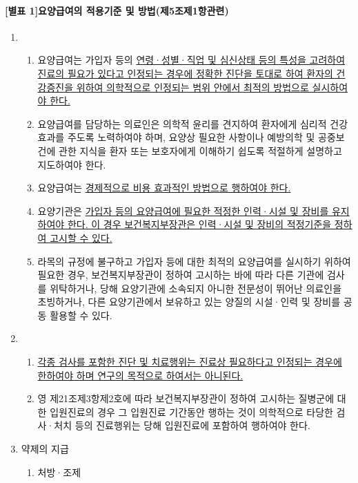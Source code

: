 \paragraph{[별표 1]요양급여의 적용기준 및 방법(제5조제1항관련)}
\begin{enumerate}[1.]\tightlist
\item {}
	\begin{enumerate}[가.]\tightlist
	\item 요양급여는 가입자 등의 \uline{연령·성별·직업 및 심신상태 등의 특성을 고려하여 진료의 필요가 있다고 인정되는 경우에 정확한 진단을 토대로 하여 환자의 건강증진을 위하여 의학적으로 인정되는 범위 안에서 최적의 방법으로 실시하여야 한다.}
	\item 요양급여를 담당하는 의료인은 의학적 윤리를 견지하여 환자에게 심리적 건강효과를 주도록 노력하여야 하며, 요양상 필요한 사항이나 예방의학 및 공중보건에 관한 지식을 환자 또는 보호자에게 이해하기 쉽도록 적절하게 설명하고 지도하여야 한다.
	\item 요양급여는 \uline{경제적으로 비용 효과적인 방법으로 행하여야 한다.}
	\item 요양기관은 \uline{가입자 등의 요양급여에 필요한 적정한 인력·시설 및 장비를 유지하여야 한다. 이 경우 보건복지부장관은 인력·시설 및 장비의 적정기준을 정하여 고시할 수 있다.}
	\item 라목의 규정에 불구하고 가입자 등에 대한 최적의 요양급여를 실시하기 위하여 필요한 경우, 보건복지부장관이 정하여 고시하는 바에 따라 다른 기관에 검사를 위탁하거나, 당해 요양기관에 소속되지 아니한 전문성이 뛰어난 의료인을 초빙하거나, 다른 요양기관에서 보유하고 있는 양질의 시설·인력 및 장비를 공동 활용할 수 있다.
	\end{enumerate}
\item {}
	\begin{enumerate}[가.]\tightlist
	\item \uline{각종 검사를 포함한 진단 및 치료행위는 진료상 필요하다고 인정되는 경우에 한하여야 하며 연구의 목적으로 하여서는 아니된다.}
	\item 영 제21조제3항제2호에 따라 보건복지부장관이 정하여 고시하는 질병군에 대한 입원진료의 경우 그 입원진료 기간동안 행하는 것이 의학적으로 타당한 검사·처치 등의 진료행위는 당해 입원진료에 포함하여 행하여야 한다.
	\end{enumerate}
\item 약제의 지급 
	\begin{enumerate}[가.]\tightlist
	\item 처방·조제

\end{enumerate}
\end{enumerate}
